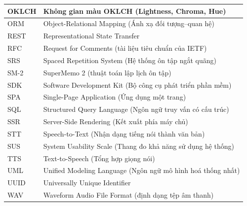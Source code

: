 \documentclass[12pt,a4paper,oneside]{report}
\begin{document}
\begin{table}[h]
\begin{tabular}{|l|l|}
    \hline
    OKLCH & Không gian màu OKLCH (Lightness, Chroma, Hue) \\
    \hline
    ORM   & Object-Relational Mapping (Ánh xạ đối tượng--quan hệ) \\
    \hline
    REST  & Representational State Transfer \\
    \hline
    RFC   & Request for Comments (tài liệu tiêu chuẩn của IETF) \\
    \hline
    SRS   & Spaced Repetition System (Hệ thống ôn tập ngắt quãng) \\
    \hline
    SM-2  & SuperMemo 2 (thuật toán lập lịch ôn tập) \\
    \hline
    SDK   & Software Development Kit (Bộ công cụ phát triển phần mềm) \\
    \hline
    SPA   & Single-Page Application (Ứng dụng một trang) \\
    \hline
    SQL   & Structured Query Language (Ngôn ngữ truy vấn có cấu trúc) \\
    \hline
    SSR   & Server-Side Rendering (Kết xuất phía máy chủ) \\
    \hline
    STT   & Speech-to-Text (Nhận dạng tiếng nói thành văn bản) \\
    \hline
    SUS   & System Usability Scale (Thang đo khả năng sử dụng hệ thống) \\
    \hline
    TTS   & Text-to-Speech (Tổng hợp giọng nói) \\
    \hline
    UML   & Unified Modeling Language (Ngôn ngữ mô hình hoá thống nhất) \\
    \hline
    UUID  & Universally Unique Identifier \\
    \hline
    WAV   & Waveform Audio File Format (định dạng tệp âm thanh) \\
    \hline
  \end{tabular}
\end{table}

\clearpage
{}




\end{document}
